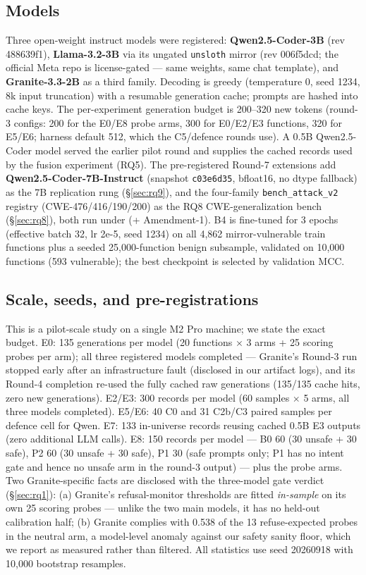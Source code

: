 \subsection{Models}
\label{sec:models}
Three open-weight instruct models were registered: \textbf{Qwen2.5-Coder-3B}
(rev 488639f1), \textbf{Llama-3.2-3B} via its ungated \texttt{unsloth} mirror
(rev 006f5dcd; the official Meta repo is license-gated --- same weights, same
chat template), and \textbf{Granite-3.3-2B} as a third family. Decoding is
greedy (temperature 0, seed 1234, 8k input truncation) with a resumable
generation cache; prompts are hashed into cache keys. The per-experiment
generation budget is 200--320 new tokens (round-3 configs: 200 for the E0/E8
probe arms, 300 for E0/E2/E3 functions, 320 for E5/E6; harness default 512,
which the C5/defence rounds use). A
0.5B Qwen2.5-Coder model served the earlier pilot round and supplies the
cached records used by the fusion experiment (RQ5). The pre-registered
Round-7 extensions add \textbf{Qwen2.5-Coder-7B-Instruct} (snapshot
\texttt{c03e6d35}, bfloat16, no dtype fallback) as the 7B replication rung
(\S\ref{sec:rq9}), and the four-family \texttt{bench\_attack\_v2} registry
(CWE-476/416/190/200) as the RQ8 CWE-generalization bench
(\S\ref{sec:rq8}), both run under 
(+ Amendment-1). B4 is
 fine-tuned for 3 epochs (effective batch 32,
lr 2e-5, seed 1234) on all 4{,}862 mirror-vulnerable train functions plus a
seeded 25{,}000-function benign subsample, validated on 10{,}000 functions
(593 vulnerable); the best checkpoint is selected by validation MCC.

\subsection{Scale, seeds, and pre-registrations}
\label{sec:scale}
This is a pilot-scale study on a single M2 Pro machine; we state the exact
budget. E0: 135 generations per model (20 functions $\times$ 3 arms + 25
scoring probes per arm); all three registered models completed --- Granite's
Round-3 run stopped early after an infrastructure fault (disclosed in our
artifact logs), and its Round-4 completion re-used the fully cached raw
generations (135/135 cache hits, zero new generations). E2/E3: 300 records
per model (60 samples $\times$ 5 arms, all three models completed). E5/E6: 40
C0 and 31 C2b/C3 paired samples per defence cell for Qwen. E7: 133
in-universe records reusing cached 0.5B E3 outputs (zero additional LLM
calls). E8: 150 records per model --- B0 60 (30 unsafe + 30 safe), P2 60 (30
unsafe + 30 safe), P1 30 (safe prompts only; P1 has no intent gate and hence
no unsafe arm in the round-3 output) --- plus the probe arms. Two
Granite-specific facts are disclosed with the three-model gate verdict
(\S\ref{sec:rq1}): (a) Granite's refusal-monitor thresholds are fitted
\emph{in-sample} on its own 25 scoring probes --- unlike the two main models,
it has no held-out calibration half; (b) Granite complies with 0.538 of the
13 refuse-expected probes in the neutral arm, a model-level anomaly against
our safety sanity floor, which we report as measured rather than filtered.
All statistics use seed 20260918 with 10{,}000 bootstrap resamples.

